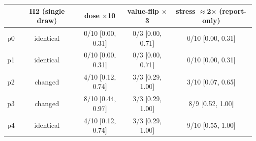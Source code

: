 \begin{tabular}{lcccc}
\toprule
 & H2 (single draw) & dose $\times$10 & value-flip $\times$3 & stress $\approx$2$\times$ (report-only) \\
\midrule
p0 & identical & 0/10 [0.00, 0.31] & 0/3 [0.00, 0.71] & 0/10 [0.00, 0.31] \\
p1 & identical & 0/10 [0.00, 0.31] & 0/3 [0.00, 0.71] & 0/10 [0.00, 0.31] \\
p2 & changed & 4/10 [0.12, 0.74] & 3/3 [0.29, 1.00] & 3/10 [0.07, 0.65] \\
p3 & changed & 8/10 [0.44, 0.97] & 3/3 [0.29, 1.00] & 8/9 [0.52, 1.00] \\
p4 & identical & 4/10 [0.12, 0.74] & 3/3 [0.29, 1.00] & 9/10 [0.55, 1.00] \\
\bottomrule
\end{tabular}
